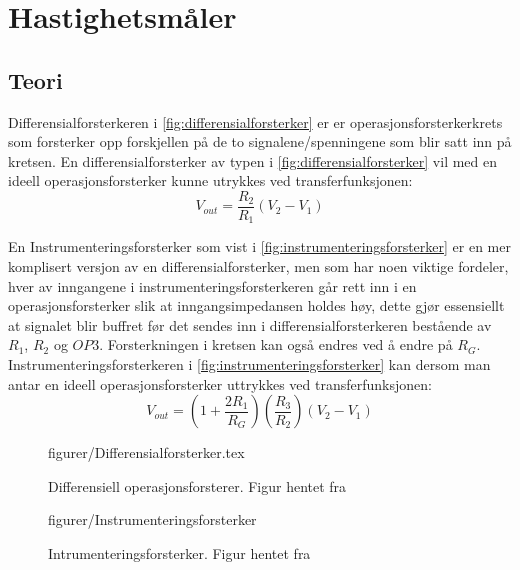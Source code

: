 \section{Hastighetsmåler}
\subsection{Teori}
Differensialforsterkeren i \autoref{fig:differensialforsterker} er er operasjonsforsterkerkrets som forsterker opp forskjellen på de to signalene/spenningene som blir satt inn på kretsen. En differensialforsterker av typen i \autoref{fig:differensialforsterker} vil med en ideell operasjonsforsterker kunne utrykkes ved transferfunksjonen\cite{Johnson}:
\begin{equation}
    V_{out} = \frac{R_2}{R_1}(V_2-V_1)
    \label{eq:differensialforsterker}
\end{equation}

En Instrumenteringsforsterker som vist i \autoref{fig:instrumenteringsforsterker} er en mer komplisert versjon av en differensialforsterker, men som har noen viktige fordeler, hver av inngangene i instrumenteringsforsterkeren går rett inn i en operasjonsforsterker slik at inngangsimpedansen holdes høy, dette gjør essensiellt at signalet blir buffret før det sendes inn i differensialforsterkeren bestående av $R_1$, $R_2$ og $OP3$. Forsterkningen i kretsen kan også endres ved å endre på $R_G$. Instrumenteringsforsterkeren i \autoref{fig:instrumenteringsforsterker} kan dersom man antar en ideell operasjonsforsterker uttrykkes ved transferfunksjonen:
\begin{equation}
    V_{out} = (1+\frac{2R_1}{R_G})(\frac{R_3}{R_2})(V_2-V_1)
    \label{eq:instrumenteringsforsterker}
\end{equation}


\begin{figure} [h]
    \centering
     {figurer/Differensialforsterker.tex}
    \caption{Differensiell operasjonsforsterer. Figur hentet fra \cite{Johnson}}
    \label{fig:differensialforsterker}
\end{figure}


\begin{figure} [h]
    \centering
     {figurer/Instrumenteringsforsterker}
    \caption{Intrumenteringsforsterker. Figur hentet fra \cite{Johnson}}
    \label{fig:instrumenteringsforsterker}
\end{figure}









